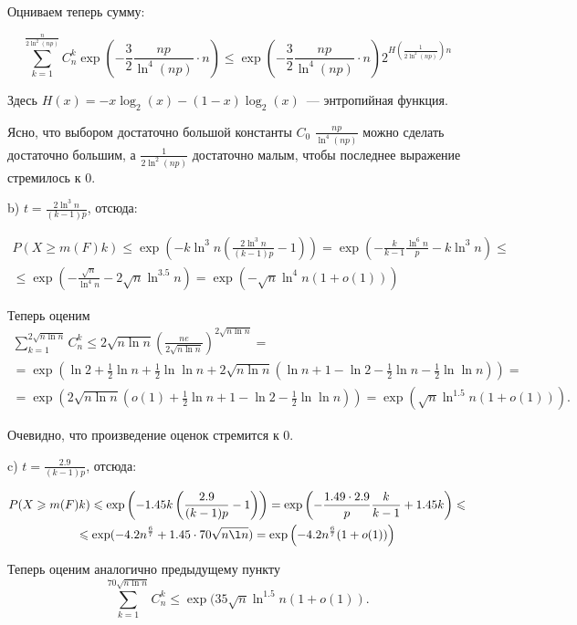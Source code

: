\documentclass{article}
\theoremstyle{definition}
\theoremstyle{remark}
\renewcommand{\le}{\leqslant}
\renewcommand{\ge}{\geqslant}
\begin{document}
Оцниваем теперь сумму:

$$
	\sum\limits_{k=1}^\frac{n}{2\ln^2(np)} C_n^k \exp\left(-\frac{3}{2} \frac{np}{\ln^4(np)} \cdot n
	\right) \le \exp\left(-\frac{3}{2} \frac{np}{\ln^4(np)} \cdot n \right)
	2^{H\left(\frac{1}{2\ln^2(np)}\right)n}
$$

Здесь $H(x) = -x \log_2(x) - (1 - x)\log_2(x)$~--- энтропийная функция.

Ясно, что выбором достаточно большой константы $C_0$ $\frac{np}{\ln^4(np)}$ можно сделать достаточно
большим, а $\frac{1}{2\ln^2(np)}$ достаточно малым, чтобы последнее выражение стремилось к 0.

b) $t = \frac{2\ln^3 n}{(k-1)p}$, отсюда:

\begin{multline*}
	P(X \ge m(F)k) \le \exp\left(-k \ln^3 n \left( \frac{2\ln^3 n}{(k-1)p} - 1\right) \right) =
	\exp\left( -\frac{k}{k-1} \frac{\ln^6 n}{p} - k\ln^3 n \right) \le\\\le
	\exp\left( -\frac{\sqrt{n}}{\ln^4 n} - 2\sqrt{n} \ln^{3.5} n \right) = \exp\left( -\sqrt{n} \ln^4 n
	(1 + o(1)) \right)
\end{multline*}

Теперь оценим
\begin{multline*}
\sum\limits_{k=1}^{2\sqrt{n\ln n}} C_n^k \le 2\sqrt{n \ln n} \left(
\frac{ne}{2\sqrt{n \ln n}} \right)^{2\sqrt{n\ln n}} =\\= \exp\left( \ln 2 + \frac{1}{2} \ln n +
\frac{1}{2} \ln \ln n + 2\sqrt{n \ln n}\left( \ln n + 1 - \ln 2 - \frac{1}{2}\ln n -
	\frac{1}{2}\ln\ln n\right) \right) =\\= \exp\left(2\sqrt{n \ln n} (o(1) + \frac{1}{2} \ln n + 1 - \ln 2
	- \frac{1}{2} \ln\ln n)\right) = \exp\left(\sqrt{n} \ln^{1.5} n (1 + o(1))\right).
\end{multline*}

Очевидно, что произведение оценок стремится к 0.

c) $t = \frac{2.9}{(k-1)p}$, отсюда:

\begin{multline*}
	P(X \ge m(F)k) \le \exp\left(-1.45k \left( \frac{2.9}{(k-1)p} - 1\right) \right) =
	\exp\left(-\frac{1.49 \cdot 2.9}{p} \frac{k}{k-1} + 1.45 k\right) \le\\\le
	\exp(-4.2 n^\frac{6}{7} + 1.45 \cdot 70 \sqrt{n \l n}) = \exp\left( -4.2n^\frac{6}{7} (1 + o(1))
	\right)
\end{multline*}

Теперь оценим аналогично предыдущему пункту
$$
	\sum\limits_{k=1}^{70\sqrt{n\ln n}} C_n^k \le \exp(35 \sqrt{n} \ln^{1.5} n (1 + o(1)).
$$
\end{document}
